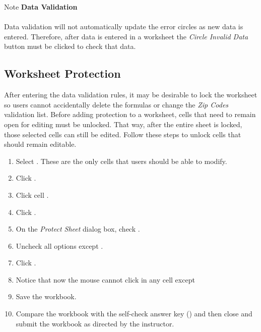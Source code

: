 \begin{center}
	\begin{infobox}{Note}
		\textbf{Data Validation}
		\\
		\\
		Data validation will not automatically update the error circles as new data is entered. Therefore, after data is entered in a worksheet the \textit{Circle Invalid Data} button must be clicked to check that data.
	\end{infobox}
\end{center}

\subsection{Worksheet Protection}

After entering the data validation rules, it may be desirable to lock the  worksheet so users cannot accidentally delete the formulas or change the \textit{Zip Codes} validation list. Before adding protection to a worksheet, cells that need to remain open for editing must be unlocked. That way, after the entire sheet is locked, those selected cells can still be edited. Follow these steps to unlock cells that should remain editable.

\begin{enumbox}
	\begin{enumerate}
		\item Select . These are the only cells that users should be able to modify.
		\item Click .
		\item Click cell .
		\item Click .
		\item On the \textit{Protect Sheet} dialog box, check .
		\item Uncheck all options except .
		\item Click .
		\item Notice that now the mouse cannot click in any cell except 
		\item Save the  workbook.
		\item Compare the workbook with the self-check answer key () and then close and submit the  workbook as directed by the instructor.
	\end{enumerate}
\end{enumbox}
	
